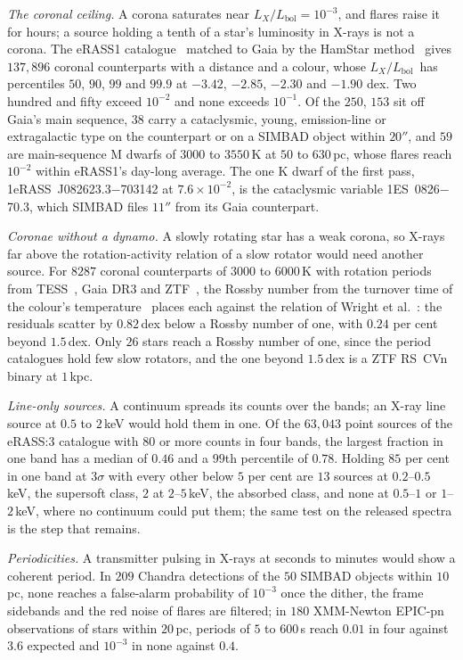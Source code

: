 \documentclass[3p,11pt]{elsarticle}
\newcommand{\lxl}{$L_X/L_\mathrm{bol}$}
\begin{document}
\emph{The coronal ceiling.} A corona saturates near \lxl$=10^{-3}$, and flares raise it
for hours; a source holding a tenth of a star's luminosity in X-rays is not a corona.
The eRASS1 catalogue~\cite{Merloni2024} matched to Gaia by the HamStar
method~\cite{Schneider2022,Freund2024} gives $137{,}896$ coronal counterparts with a
distance and a colour, whose \lxl\ has percentiles $50$, $90$, $99$ and $99.9$ at
$-3.42$, $-2.85$, $-2.30$ and $-1.90$ dex. Two hundred and fifty exceed $10^{-2}$ and none
exceeds $10^{-1}$. Of the $250$, $153$ sit off Gaia's main sequence, $38$ carry a
cataclysmic, young, emission-line or extragalactic type on the counterpart or on a SIMBAD
object within $20''$, and $59$ are main-sequence M dwarfs of $3000$ to $3550$\,K at $50$
to $630$\,pc, whose flares reach $10^{-2}$ within eRASS1's day-long average. The one K
dwarf of the first pass, 1eRASS~J082623.3$-$703142 at $7.6\times10^{-2}$, is the
cataclysmic variable 1ES~0826$-$70.3, which SIMBAD files $11''$ from its Gaia counterpart.

\emph{Coronae without a dynamo.} A slowly rotating star has a weak corona, so X-rays far
above the rotation-activity relation of a slow rotator would need another source. For
$8287$ coronal counterparts of $3000$ to $6000$\,K with rotation periods from
TESS~\cite{Fetherolf2023}, Gaia DR3 and ZTF~\cite{Chen2020}, the Rossby number from the
turnover time of the colour's temperature~\cite{CranmerSaar2011} places each against the
relation of Wright et al.~\cite{Wright2011}: the residuals scatter by $0.82$\,dex below a
Rossby number of one, with $0.24$ per cent beyond $1.5$\,dex. Only $26$ stars reach a
Rossby number of one, since the period catalogues hold few slow rotators, and the one
beyond $1.5$\,dex is a ZTF RS~CVn binary at $1$\,kpc.

\emph{Line-only sources.} A continuum spreads its counts over the bands; an X-ray line
source at $0.5$ to $2$\,keV would hold them in one. Of the $63{,}043$ point sources of the
eRASS:3 catalogue with $80$ or more counts in four bands, the largest fraction in one
band has a median of $0.46$ and a $99$th percentile of $0.78$. Holding $85$ per cent in
one band at $3\sigma$ with every other below $5$ per cent are $13$ sources at
$0.2$--$0.5$\,keV, the supersoft class, $2$ at $2$--$5$\,keV, the absorbed class, and none
at $0.5$--$1$ or $1$--$2$\,keV, where no continuum could put them; the same test on the
released spectra is the step that remains.

\emph{Periodicities.} A transmitter pulsing in X-rays at seconds to minutes would show a
coherent period. In $209$ Chandra detections of the $50$ SIMBAD objects within $10$\,pc,
none reaches a false-alarm probability of $10^{-3}$ once the dither, the frame
sidebands and the red noise of flares are filtered; in $180$ XMM-Newton EPIC-pn
observations of stars within $20$\,pc, periods of $5$ to $600$\,s reach $0.01$ in four
against $3.6$ expected and $10^{-3}$ in none against $0.4$.
\end{document}
